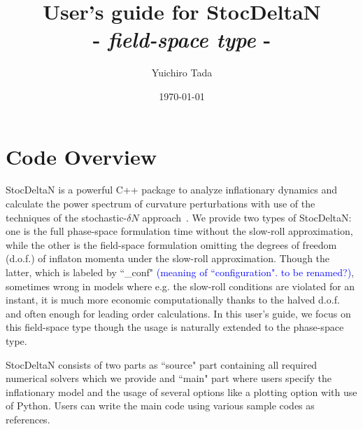 \documentclass[aps, prd
, preprint
, nofootinbib 
, notitlepage
, superscriptaddress
, longbibliography
]{revtex4-1}
\newcommand{\Blue}[1]{\textcolor{blue}{\sffamily #1}}
\begin{document}
\title{User's guide for StocDeltaN \\[-10pt] {- \small\textit{field-space type} -}}
\date{\today}

\author{Yuichiro Tada}



\maketitle

\vspace{-30pt}
\section{Code Overview}

StocDeltaN is a powerful C++ package to analyze inflationary dynamics and calculate the power spectrum of curvature perturbations with use of the techniques of 
the stochastic-$\delta N$ approach~\cite{Fujita:2013cna,Vennin:2015hra}. We provide two types of StocDeltaN: one is the full phase-space formulation time without the slow-roll approximation,
while the other is the field-space formulation omitting the degrees of freedom (d.o.f.) of inflaton momenta under the slow-roll approximation.
Though the latter, which is labeled by ``\_conf" \Blue{(meaning of ``configuration". to be renamed?)}, sometimes wrong in models where e.g. the slow-roll conditions are violated for an instant,
it is much more economic computationally thanks to the halved d.o.f. and often enough for leading order calculations.
In this user's guide, we focus on this field-space type though the usage is naturally extended to the phase-space type.

StocDeltaN consists of two parts as ``source" part containing all required numerical solvers which we provide and ``main" part where users specify the inflationary model
and the usage of several options like a plotting option with use of Python. Users can write the main code using various sample codes as references.
\end{document}
